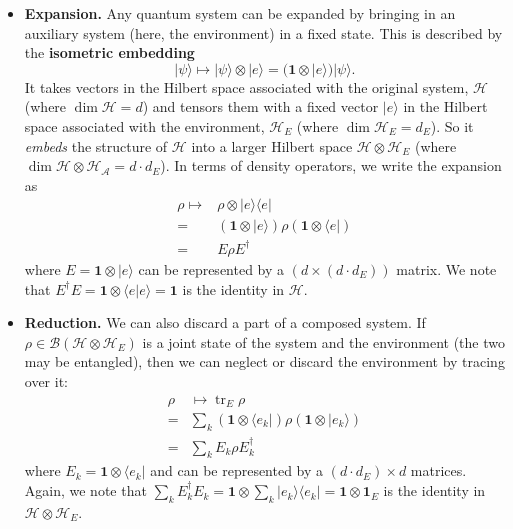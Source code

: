 \documentclass[fleqn]{article}
\begin{document}
\begin{itemize}
\item
  \textbf{Expansion.}
  Any quantum system can be expanded by bringing in an auxiliary system (here, the environment) in a fixed state.
  This is described by the \textbf{isometric embedding}
  \[
      |\psi\rangle
      \longmapsto |\psi\rangle\otimes|e\rangle
      = (\mathbf{1}\otimes|e\rangle) |\psi\rangle.
    \]
  It takes vectors in the Hilbert space associated with the original system, \(\mathcal{H}\) (where \(\dim\mathcal{H}=d\)) and tensors them with a fixed vector \(|e\rangle\) in the Hilbert space associated with the environment, \(\mathcal{H}_E\) (where \(\dim\mathcal{H}_E=d_E\)).
  So it \emph{embeds} the structure of \(\mathcal{H}\) into a larger Hilbert space \(\mathcal{H}\otimes\mathcal{H}_E\) (where \(\dim\mathcal{H}\otimes\mathcal{H}_{\mathcal{A}}=d\cdot d_E\)).
  In terms of density operators, we write the expansion as
  \[
      \begin{aligned}
        \rho
        \longmapsto &\rho\otimes|e\rangle\langle e|
      \\=& (\mathbf{1}\otimes|e\rangle)\rho (\mathbf{1}\otimes\langle e|)
      \\=& E\rho E^\dagger
      \end{aligned}
    \]
  where \(E=\mathbf{1}\otimes|e\rangle\) can be represented by a \((d\times(d\cdot d_E))\) matrix.
  We note that \(E^\dagger E=\mathbf{1}\otimes\langle e|e\rangle=\mathbf{1}\) is the identity in \(\mathcal{H}\).
\item
  \textbf{Reduction.}
  We can also discard a part of a composed system.
  If \(\rho\in\mathscr{B}(\mathcal{H}\otimes\mathcal{H}_E)\) is a joint state of the system and the environment (the two may be entangled), then we can neglect or discard the environment by tracing over it:
  \[
      \begin{aligned}
        \rho
        &\longmapsto \operatorname{tr}_E\rho
      \\=&\sum_k (\mathbf{1}\otimes\langle e_k|) \rho (\mathbf{1}\otimes|e_k\rangle)
      \\=& \sum_k E_k \rho E^\dagger_k
      \end{aligned}
    \]
  where \(E_k=\mathbf{1}\otimes\langle e_k|\) and can be represented by a \((d\cdot d_E)\times d\) matrices.
  Again, we note that \(\sum_k E_k^\dagger E_k=\mathbf{1}\otimes\sum_k|e_k\rangle\langle e_k|=\mathbf{1}\otimes\mathbf{1}_E\) is the identity in \(\mathcal{H}\otimes\mathcal{H}_E\).
\end{itemize}
\end{document}
